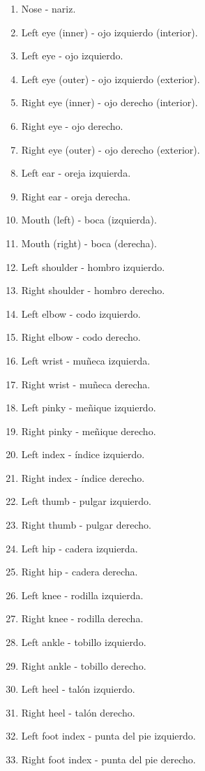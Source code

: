 \begin{enumerate}
    \item Nose - nariz.  
    \item Left eye (inner) - ojo izquierdo (interior).  
    \item Left eye - ojo izquierdo.  
    \item Left eye (outer) - ojo izquierdo (exterior).  
    \item Right eye (inner) - ojo derecho (interior).  
    \item Right eye - ojo derecho.  
    \item Right eye (outer) - ojo derecho (exterior).  
    \item Left ear - oreja izquierda.  
    \item Right ear - oreja derecha.  
    \item Mouth (left) - boca (izquierda).  
    \item Mouth (right) - boca (derecha).  
    \item Left shoulder - hombro izquierdo.  
    \item Right shoulder - hombro derecho.  
    \item Left elbow - codo izquierdo.  
    \item Right elbow - codo derecho.  
    \item Left wrist - muñeca izquierda.  
    \item Right wrist - muñeca derecha.  
    \item Left pinky - meñique izquierdo.  
    \item Right pinky - meñique derecho.  
    \item Left index - índice izquierdo.  
    \item Right index - índice derecho.  
    \item Left thumb - pulgar izquierdo.  
    \item Right thumb - pulgar derecho.  
    \item Left hip - cadera izquierda.  
    \item Right hip - cadera derecha.  
    \item Left knee - rodilla izquierda.  
    \item Right knee - rodilla derecha.  
    \item Left ankle - tobillo izquierdo.  
    \item Right ankle - tobillo derecho.  
    \item Left heel - talón izquierdo.  
    \item Right heel - talón derecho.  
    \item Left foot index - punta del pie izquierdo.  
    \item Right foot index - punta del pie derecho.  
\end{enumerate}


